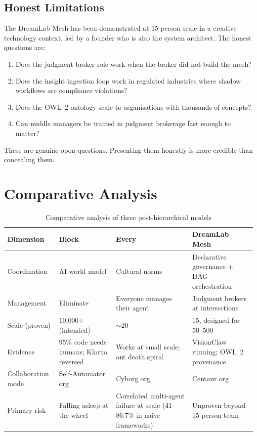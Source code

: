 \subsection{Honest Limitations}

The DreamLab Mesh has been demonstrated at 15-person scale in a creative technology context, led by a founder who is also the system architect. The honest questions are:

\begin{enumerate}
  \item Does the judgment broker role work when the broker did not build the mesh?
  \item Does the insight ingestion loop work in regulated industries where shadow workflows are compliance violations?
  \item Does the OWL~2 ontology scale to organisations with thousands of concepts?
  \item Can middle managers be trained in judgment brokerage fast enough to matter?
\end{enumerate}

These are genuine open questions. Presenting them honestly is more credible than concealing them.

\section{Comparative Analysis}

\begin{table}[h]
\centering
\caption{Comparative analysis of three post-hierarchical models}
\label{tab:three-models}
\begin{tabularx}{\textwidth}{l L{3cm} L{3cm} X}
\toprule
\textbf{Dimension} & \textbf{Block} & \textbf{Every} & \textbf{DreamLab Mesh} \\
\midrule
Coordination & AI world model & Cultural norms & Declarative governance + DAG orchestration \\
\addlinespace
Management & Eliminate & Everyone manages their agent & Judgment brokers at intersections \\
\addlinespace
Scale (proven) & 10,000+ (intended) & $\sim$20 & 15, designed for 50--500 \\
\addlinespace
Evidence & 95\% code needs humans; Klarna reversed & Works at small scale; ant death spiral & VisionClaw running; OWL~2 provenance \\
\addlinespace
Collaboration mode & Self-Automator org & Cyborg org & Centaur org \\
\addlinespace
Primary risk & Falling asleep at the wheel & Correlated multi-agent failure at scale (41--86.7\% in naive frameworks) & Unproven beyond 15-person team \\
\bottomrule
\end{tabularx}
\end{table}

